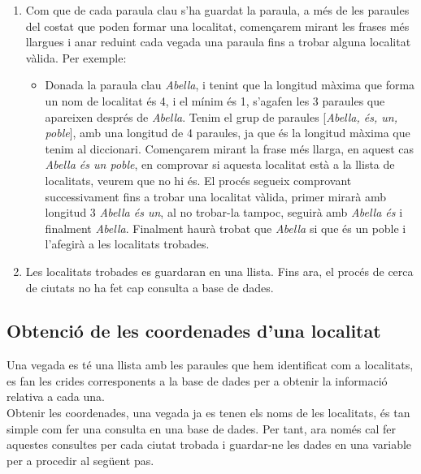 \documentclass[12pt,a4paper,openright,oneside]{article}
\numberwithin{equation}{section}
\theoremstyle{definition}
\begin{document}
\begin{enumerate}
\begin{enumerate}
\item Com que de cada paraula clau s'ha guardat la paraula, a més de les paraules del costat que poden formar una localitat, començarem mirant les frases més llargues i anar reduint cada vegada una paraula fins a trobar alguna localitat vàlida. Per exemple:
\begin{itemize}
\item Donada la paraula clau \emph{Abella}, i tenint que la longitud màxima que forma un nom de localitat és 4, i el mínim és 1, s'agafen les 3 paraules que apareixen després de \emph{Abella}. Tenim el grup de paraules [\emph{Abella, és, un, poble}], amb una longitud de 4 paraules, ja que és la longitud màxima que tenim al diccionari. Començarem mirant la frase més llarga, en aquest cas \emph{Abella és un poble}, en comprovar si aquesta localitat està a la llista de localitats, veurem que no hi és. El procés segueix comprovant successivament fins a trobar una localitat vàlida, primer mirarà amb longitud 3 \emph{Abella és un}, al no trobar-la tampoc, seguirà amb \emph{Abella és} i finalment \emph{Abella}. Finalment haurà trobat que \emph{Abella} si que és un poble i l'afegirà a les localitats trobades.
\end{itemize}
\item Les localitats trobades es guardaran en una llista. Fins ara, el procés de cerca de ciutats no ha fet cap consulta a base de dades.
\end{enumerate}
\end{enumerate}
 
\subsection{Obtenció de les coordenades d'una localitat}
Una vegada es té una llista amb les paraules que hem identificat com a localitats, es fan les crides corresponents a la base de dades per a obtenir la informació relativa a cada una.\\
Obtenir les coordenades, una vegada ja es tenen els noms de les localitats, és tan simple com fer una consulta en una base de dades. Per tant, ara només cal fer aquestes consultes per cada ciutat trobada i guardar-ne les dades en una variable per a procedir al següent pas.
\end{document}
